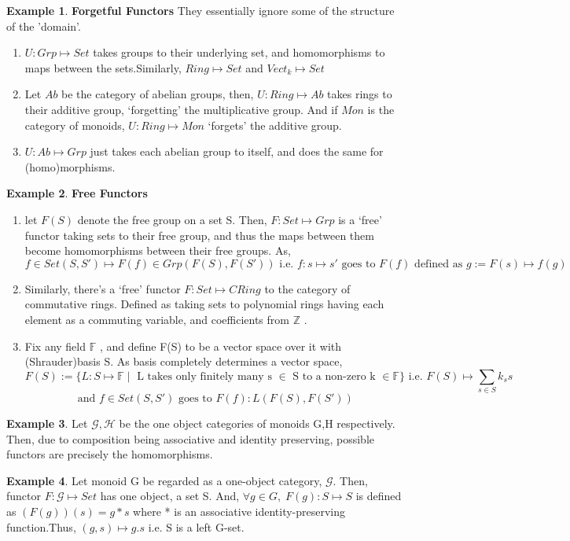 \documentclass{article}
\theoremstyle{definition}
\newtheorem{example}{Example}[section]
\theoremstyle{definition}
\begin{document}
\begin{example}{\textbf{Forgetful Functors}} %
They essentially ignore some of the structure of the 'domain'.
\begin{enumerate}[label=(\alph*)]
		\item $ U:Grp\mapsto Set $ takes groups to their underlying set, and homomorphisms to maps between the sets.Similarly, $ Ring \mapsto Set $ and $ Vect_k \mapsto Set $
		\item Let $ Ab $ be the category of abelian groups, then,   $ U:Ring \mapsto Ab $ takes rings to their additive group, `forgetting' the multiplicative group. And if $ Mon $ is the category of monoids, $ U:Ring \mapsto Mon $ `forgets' the additive group.
		\item $ U:Ab \mapsto Grp $ just takes each abelian group to itself, and does the same for (homo)morphisms.
	\end{enumerate}
\end{example}
\begin{example}{\textbf{Free Functors}} %
	\begin{enumerate}[label=(\alph*)]
		\item let $ F(S) $ denote the free group on a set S. Then, $ F:Set \mapsto Grp $ is a `free' functor taking sets to their free group, and thus the maps between them become homomorphisms between their free groups. As,
			\[ f \in Set(S,S') \mapsto F(f) \in Grp(F(S),F(S')) \text{ i.e. } f:s \mapsto s' \text{ goes to } F(f) \text{ defined as } g:=F(s) \mapsto f(g)    \]
		\item Similarly, there's a `free' functor $ F:Set \mapsto CRing $ to the category of commutative rings. Defined as taking sets to polynomial rings having each element as a commuting variable, and coefficients from $ \mathbb{Z}$  .
		\item Fix any field $ \mathbb{F} $ , and define F(S) to be a vector space over it with (Shrauder)basis S. As basis completely determines a vector space,
			\[ F(S):= \{ L: S \mapsto \mathbb{F} \; |\; \text{ L takes only finitely many s } \in \text{ S to a non-zero k } \in \mathbb{F} \} \text{ i.e. } F(S) \mapsto \sum_{s \in S} k_ss  \]
			\[ \text{ and } f \in Set(S,S') \text{ goes to } F(f): L(F(S),F(S'))\]
	\end{enumerate}
\end{example}
\begin{example}
	Let $ \mathcal{G}, \mathcal{H}$ be the one object categories of monoids G,H respectively. Then, due to composition being associative and identity preserving, possible functors are precisely the homomorphisms.
\end{example}
\begin{example}
	Let monoid G be regarded as a one-object category, $ \mathcal{G} $. Then, functor $ F:\mathcal{G} \mapsto Set $ has one object, a set S. And, $ \forall g \in G, \; F(g):S \mapsto S  $ is defined as $ (F(g))(s)=g*s$ where * is an associative identity-preserving function.Thus, $ (g,s) \mapsto g.s $ i.e. S is a left G-set.
\end{example}
\end{document}
